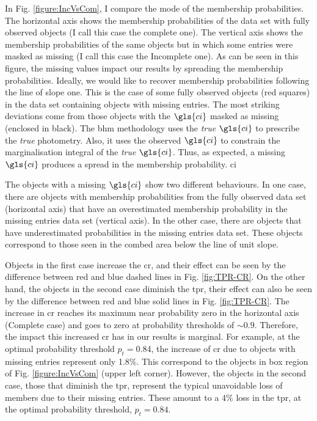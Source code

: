 In Fig. \ref{figure:IncVsCom}, I compare the mode of the membership probabilities. The horizontal axis shows the membership probabilities of the data set with fully observed objects (I call this case the complete one). The vertical axis shows the membership probabilities of the same objects but in which some entries were masked as missing (I call this case the Incomplete one). As can be seen in this figure, the missing values impact our results by spreading the membership probabilities. Ideally, we would like to recover membership probabilities following the line of slope one. This is the case of some fully observed objects (red squares) in the data set containing objects with missing entries. The most striking deviations come from those objects with the $\gls{ci}$ masked as missing (enclosed in black). The \gls{bhm} methodology uses the \emph{true} $\gls{ci}$ to prescribe the \emph{true} photometry. Also, it uses the observed $\gls{ci}$ to constrain the marginalisation integral of the \emph{true} $\gls{ci}$. Thus, as expected, a missing $\gls{ci}$ produces a spread in the membership probability. \gls{ci}

The objects with a missing $\gls{ci}$ show two different behaviours. In one case, there are objects with membership probabilities from the fully observed data set (horizontal axis) that have an overestimated membership probability in the missing entries data set (vertical axis). In the other case, there are objects that have underestimated probabilities in the missing entries data set. These objects correspond to those seen in the combed area below the line of unit slope. 

Objects in the first case increase the \gls{cr}, and their effect can be seen by the difference between red and blue dashed lines in Fig. \ref{fig:TPR-CR}. On the other hand, the objects in the second case diminish the \gls{tpr}, their effect can also be seen by the difference between red and blue solid lines in Fig. \ref{fig:TPR-CR}. The increase in \gls{cr} reaches its maximum near probability zero in the horizontal axis (Complete case) and goes to zero at probability thresholds of $\sim 0.9$. Therefore, the impact this increased \gls{cr} has in our results is marginal. For example, at the optimal probability threshold $p_t=0.84$, the increase of \gls{cr} due to objects with missing entries represent only 1.8\%. This correspond to the objects in box region of Fig. \ref{figure:IncVsCom} (upper left corner). However, the objects in the second case, those that diminish the \gls{tpr}, represent the typical unavoidable loss of members due to their missing entries. These amount to a 4\% loss in the \gls{tpr}, at the optimal probability threshold, $p_t=0.84$.


